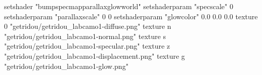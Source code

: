 setshader "bumpspecmapparallaxglowworld"
setshaderparam "specscale" 0
setshaderparam "parallaxscale" 0 0
setshaderparam "glowcolor" 0.0 0.0 0.0
texture 0 "getridou/getridou_labcamo1-diffuse.png"
texture n "getridou/getridou_labcamo1-normal.png"
texture s "getridou/getridou_labcamo1-specular.png"
texture z "getridou/getridou_labcamo1-displacement.png"
texture g "getridou/getridou_labcamo1-glow.png"